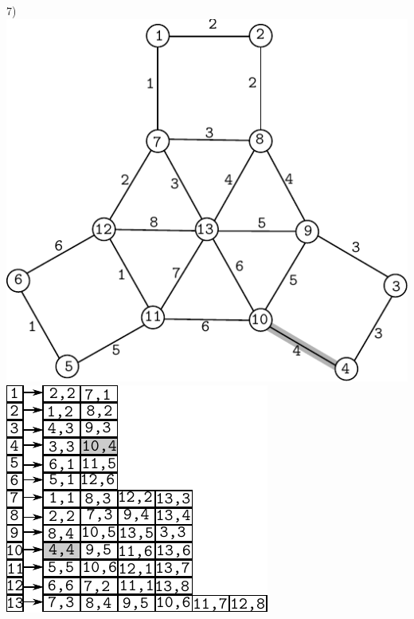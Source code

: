 \documentclass{article}
\begin{document}
\begin{center}
7)\includegraphics[scale=0.6]{bottleneck/g7}
\hspace{5mm}
\includegraphics[scale=0.9]{bottleneck/l7}
\end{center}
\end{document}
